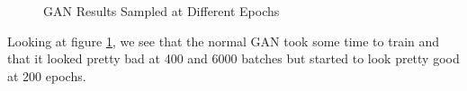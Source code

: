 \documentclass[12pt,
 reprint,
nofootinbib,
 amsmath,amssymb,
 aps,
floatfix,
]{revtex4-2}
\begin{document}
\begin{figure}[h!]
    \centering
    \qquad
    \qquad
    \caption{GAN Results Sampled at Different Epochs}%
    \label{fig:ganResults}%
\end{figure}

Looking at figure \ref{fig:ganResults}, we see that the normal GAN took some time to train and that it looked pretty bad at 400 and 6000 batches but started to look pretty good at 200 epochs. 
\end{document}
